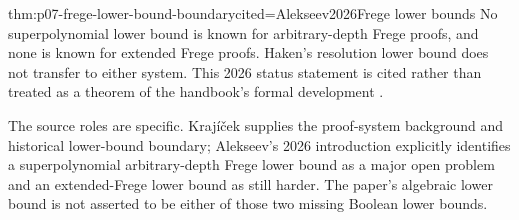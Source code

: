 \begin{hbtheorem}{thm:p07-frege-lower-bound-boundary}{cited=Alekseev2026}{Frege lower bounds}
No superpolynomial lower bound is known for arbitrary-depth Frege proofs, and
none is known for extended Frege proofs.  Haken's resolution lower bound does
not transfer to either system.  This 2026 status statement is cited rather
than treated as a theorem of the handbook's formal development
\cite{Krajicek2019,Alekseev2026}.
\end{hbtheorem}

The source roles are specific.  Kraj\'i\v{c}ek supplies the proof-system
background and historical lower-bound boundary; Alekseev's 2026 introduction
explicitly identifies a superpolynomial arbitrary-depth Frege lower bound as a
major open problem and an extended-Frege lower bound as still harder.  The
paper's algebraic lower bound is not asserted to be either of those two
missing Boolean lower bounds.

